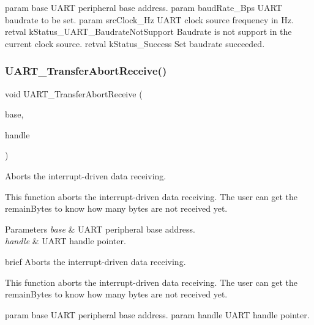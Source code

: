 param base U\+A\+RT peripheral base address. param baud\+Rate\+\_\+\+Bps U\+A\+RT baudrate to be set. param src\+Clock\+\_\+\+Hz U\+A\+RT clock source frequency in Hz. retval k\+Status\+\_\+\+U\+A\+R\+T\+\_\+\+Baudrate\+Not\+Support Baudrate is not support in the current clock source. retval k\+Status\+\_\+\+Success Set baudrate succeeded. \mbox{\label{group__uart__driver_gacc35671622b2401545cc55cc6ae572d4}} 
\subsubsection{\texorpdfstring{UART\_TransferAbortReceive()}{UART\_TransferAbortReceive()}}
{\footnotesize\ttfamily void U\+A\+R\+T\+\_\+\+Transfer\+Abort\+Receive (\begin{DoxyParamCaption}\item[{\mbox{\hyperlink{struct_u_a_r_t___type}{U\+A\+R\+T\+\_\+\+Type}} $\ast$}]{base,  }\item[{\mbox{\hyperlink{struct__uart__handle}{uart\+\_\+handle\+\_\+t}} $\ast$}]{handle }\end{DoxyParamCaption})}



Aborts the interrupt-\/driven data receiving. 

This function aborts the interrupt-\/driven data receiving. The user can get the remain\+Bytes to know how many bytes are not received yet.


\begin{DoxyParams}{Parameters}
{\em base} & U\+A\+RT peripheral base address. \\
\hline
{\em handle} & U\+A\+RT handle pointer.\\
\hline
\end{DoxyParams}
brief Aborts the interrupt-\/driven data receiving.

This function aborts the interrupt-\/driven data receiving. The user can get the remain\+Bytes to know how many bytes are not received yet.

param base U\+A\+RT peripheral base address. param handle U\+A\+RT handle pointer. \mbox{\label{group__uart__driver_gaa64f9f89d8286fd3ef0736a8c40be2c2}} 
